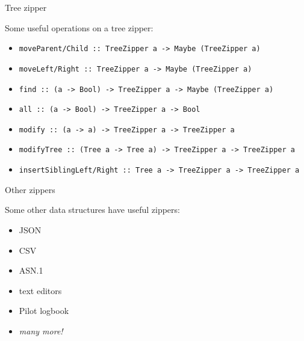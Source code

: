 \begin{frame}[fragile]
\begin{block}{Tree zipper}
\begin{center}
Some useful operations on a tree zipper:
\begin{itemize}
  \item<1-> \tiny{\lstinline{moveParent/Child :: TreeZipper a -> Maybe (TreeZipper a)}}
  \item<2-> \tiny{\lstinline{moveLeft/Right :: TreeZipper a -> Maybe (TreeZipper a)}}
  \item<3-> \tiny{\lstinline{find :: (a -> Bool) -> TreeZipper a -> Maybe (TreeZipper a)}}
  \item<4-> \tiny{\lstinline{all :: (a -> Bool) -> TreeZipper a -> Bool}}
  \item<5-> \tiny{\lstinline{modify :: (a -> a) -> TreeZipper a -> TreeZipper a}}
  \item<6-> \tiny{\lstinline{modifyTree :: (Tree a -> Tree a) -> TreeZipper a -> TreeZipper a}}
  \item<7-> \tiny{\lstinline{insertSiblingLeft/Right :: Tree a -> TreeZipper a -> TreeZipper a}}
\end{itemize}
\end{center}
\end{block}
\end{frame}

\begin{frame}[fragile]
\begin{block}{Other zippers}
\begin{center}
Some other data structures have useful zippers:
\begin{itemize}
  \item JSON
  \item CSV
  \item ASN.1
  \item text editors
  \item Pilot logbook
  \item \emph{many more!}
\end{itemize}
\end{center}
\end{block}
\end{frame}
